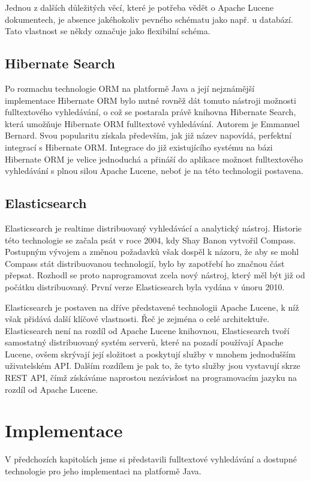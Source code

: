 \documentclass[11pt,draft,oneside]{fithesis2}
\begin{document}
Jednou z dalších důležitých věcí, které je potřeba vědět o Apache Lucene dokumentech, je absence jakéhokoliv pevného schématu jako např. u databází. Tato vlastnost se někdy označuje jako flexibilní schéma. 








\section{Hibernate Search}
Po rozmachu technologie ORM na platformě Java a její nejznámější implementace Hibernate ORM bylo nutné rovněž dát tomuto nástroji možnosti fulltextového vyhledávání, o což se postarala právě knihovna Hibernate Search, která umožňuje Hibernate ORM fulltextové vyhledávání. Autorem je Emmanuel Bernard. 
Svou popularitu získala především, jak již název napovídá, perfektní integrací s Hibernate ORM. Integrace do již existujícího systému na bázi Hibernate ORM je velice jednoduchá a přináší do aplikace možnost fulltextového vyhledávání s plnou silou Apache Lucene, neboť je na této technologii postavena.

\section{Elasticsearch}
Elasticsearch je realtime distribuovaný vyhledávácí a analytický nástroj. Historie této technologie se začala psát v roce 2004, kdy Shay Banon vytvořil Compass. Postupným vývojem a změnou požadavků však dospěl k názoru, že aby se mohl Compass stát distribuovanou technologií, bylo by zapotřebí ho značnou část přepsat.
Rozhodl se proto naprogramovat zcela nový nástroj, který měl být již od počátku distribuovaný. První verze Elasticsearch byla vydána v únoru 2010.

Elasticsearch je postaven na dříve představené technologii Apache Lucene, k níž však přidává další klíčové vlastnosti. Řeč je zejména o celé architektuře. Elasticsearch není na rozdíl od Apache Lucene knihovnou, Elasticsearch tvoří samostatný distribuovaný systém serverů, které na pozadí používají Apache Lucene, ovšem 
skrývají její složitost a poskytují služby v mnohem jednodušším uživatelském API. Dalším rozdílem je pak to, že tyto služby jsou vystavují skrze REST API, čímž získáváme naprostou nezávislost na programovacím jazyku na rozdíl od Apache Lucene. 

\chapter{Implementace}
V předchozích kapitolách jsme si představili fulltextové vyhledávání a dostupné technologie pro jeho implementaci na platformě Java. 
\end{document}
